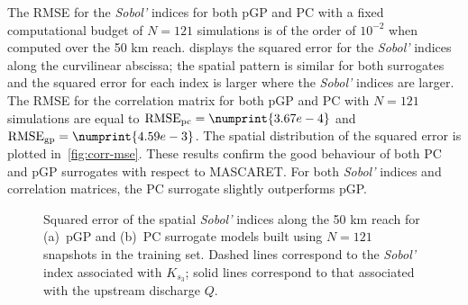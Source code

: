 The RMSE for the \emph{Sobol'} indices for both pGP and PC with a fixed computational budget of $N = 121$ simulations is of the order of $10^{-2}$ when computed over the 50 km reach.  displays the squared error for the \emph{Sobol'} indices along the curvilinear abscissa; the spatial pattern is similar for both surrogates and the squared error for each index is larger where the \emph{Sobol'} indices are larger. The RMSE for the correlation matrix for both pGP and PC with $N = 121$ simulations are equal to $\text{RMSE}_{\text{pc}} = \numprint{3.67e-4}$ and $\text{RMSE}_{\text{gp}} = \numprint{4.59e-3}$. The spatial distribution of the squared error is plotted in~\cref{fig:corr-mse}. These results confirm the good behaviour of both PC and pGP surrogates with respect to MASCARET. For both \emph{Sobol'} indices and correlation matrices, the PC surrogate slightly outperforms pGP. 

\begin{figure}[!ht]               
\centering
{}
\caption{Squared error of the spatial \emph{Sobol'} indices along the 50 km reach for (a)~pGP and (b)~PC surrogate models built using $N = 121$ snapshots in the training set. Dashed lines correspond to the \emph{Sobol'} index associated with $K_{s_3}$; solid lines correspond to that associated with the upstream discharge $Q$.}
\label{fig:sobol-map}
\end{figure}

